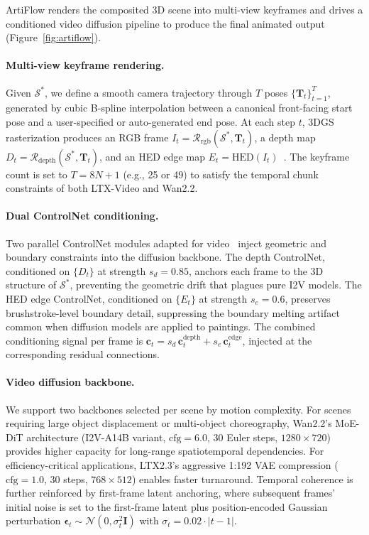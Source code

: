 ArtiFlow renders the composited 3D scene into multi-view keyframes and drives a
conditioned video diffusion pipeline to produce the final animated output
(Figure~\ref{fig:artiflow}).

\paragraph{Multi-view keyframe rendering.}
Given $\mathcal{S}^*$, we define a smooth camera trajectory through $T$ poses
$\{\mathbf{T}_t\}_{t=1}^{T}$, generated by cubic B-spline interpolation between
a canonical front-facing start pose and a user-specified or auto-generated end
pose. At each step $t$, 3DGS rasterization produces an RGB frame
$I_t = \mathcal{R}_\text{rgb}(\mathcal{S}^*,\mathbf{T}_t)$, a depth map
$D_t = \mathcal{R}_\text{depth}(\mathcal{S}^*,\mathbf{T}_t)$, and an HED edge
map $E_t = \text{HED}(I_t)$~\cite{xie2015hed}. The keyframe count is set to
$T = 8N+1$ (e.g., 25 or 49) to satisfy the temporal chunk constraints of both
LTX-Video and Wan2.2.

\paragraph{Dual ControlNet conditioning.}
Two parallel ControlNet modules adapted for video~\cite{wang2024easycontrol}
inject geometric and boundary constraints into the diffusion backbone. The depth
ControlNet, conditioned on $\{D_t\}$ at strength $s_d = 0.85$, anchors each
frame to the 3D structure of $\mathcal{S}^*$, preventing the geometric drift
that plagues pure I2V models. The HED edge ControlNet, conditioned on
$\{E_t\}$ at strength $s_e = 0.6$, preserves brushstroke-level boundary detail,
suppressing the boundary melting artifact common when diffusion models are
applied to paintings. The combined conditioning signal per frame is
$\mathbf{c}_t = s_d \, \mathbf{c}_t^\text{depth} + s_e \,
\mathbf{c}_t^\text{edge}$, injected at the corresponding residual connections.

\paragraph{Video diffusion backbone.}
We support two backbones selected per scene by motion complexity. For scenes
requiring large object displacement or multi-object choreography, Wan2.2's
MoE-DiT architecture (I2V-A14B variant, $\text{cfg}=6.0$, 30 Euler steps,
$1280\times 720$) provides higher capacity for long-range spatiotemporal
dependencies. For efficiency-critical applications, LTX2.3's aggressive 1:192
VAE compression ($\text{cfg}=1.0$, 30 steps, $768\times 512$) enables faster
turnaround. Temporal coherence is further reinforced by first-frame latent
anchoring, where subsequent frames' initial noise is set to the first-frame
latent plus position-encoded Gaussian perturbation
$\boldsymbol{\epsilon}_t \sim \mathcal{N}(0, \sigma_t^2\mathbf{I})$ with
$\sigma_t = 0.02 \cdot |t-1|$.

